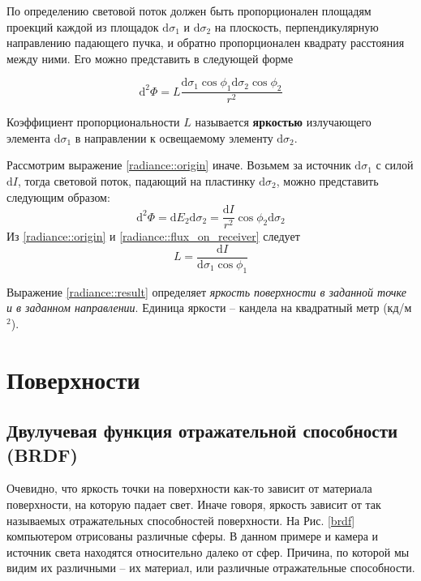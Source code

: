 \documentclass[12pt]{article}
\def\d{ \mathrm{d} }
\begin{document}
По определению световой поток должен быть пропорционален площадям
проекций каждой из площадок $\d\sigma_1$ и $\d\sigma_2$ на плоскость,
перпендикулярную направлению падающего пучка, и обратно пропорционален квадрату
расстояния между ними. Его можно представить в следующей форме

\begin{equation}\label{radiance::origin}
  \d^2\Phi=L\frac{\d\sigma_1\cos\phi_1\d\sigma_2\cos\phi_2}{r^2}
\end{equation}

Коэффициент пропорциональности $L$
называется \textbf{яркостью} излучающего элемента $\d\sigma_1$ в направлении
к освещаемому элементу $\d\sigma_2$.

Рассмотрим выражение \eqref{radiance::origin} иначе. Возьмем за источник $\d\sigma_1$ с силой $\d I$,
тогда световой поток, падающий на пластинку $\d\sigma_2$, можно представить следующим образом:
\begin{equation}\label{radiance::flux_on_receiver}
  \d^2\Phi=\d E_2\d\sigma_2=\frac{\d I}{r^2}\cos\phi_2\d\sigma_2
\end{equation}
Из \eqref{radiance::origin} и \eqref{radiance::flux_on_receiver} следует
\begin{equation}\label{radiance::result}
  L = \frac{\d I}{\d\sigma_1\cos\phi_1}
\end{equation}

Выражение \eqref{radiance::result} определяет \textit{яркость поверхности в заданной точке
  и в заданном направлении}. Единица яркости -- кандела на квадратный метр (кд/м$^2$).


\newpage

\section{Поверхности}

\subsection{Двулучевая функция отражательной способности (BRDF)}

Очевидно, что яркость точки на поверхности как-то зависит от материала поверхности,
на которую падает свет. Иначе говоря, яркость зависит от так называемых отражательных
способностей поверхности. На Рис. \eqref{brdf} компьютером отрисованы различные сферы.
В данном примере и камера и источник света находятся относительно далеко от сфер.
Причина, по которой мы видим их различными -- их материал, или различные отражательные способности.
\end{document}
